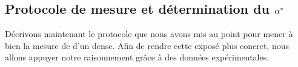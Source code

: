 \casse

\subsection[Protocole de mesure et détermination du \pdc]{Protocole de mesure et détermination du \pdc ${{\alpha}^{*}}$}\label{sec:ProtocoleMesureImperf}

Décrivons maintenant le protocole que nous avons mis au point pour mener à bien la mesure de \dcol d'un \nat dense. Afin de rendre cette exposé plus concret, nous allons appuyer notre raisonnement grâce à des données expérimentales.
%

